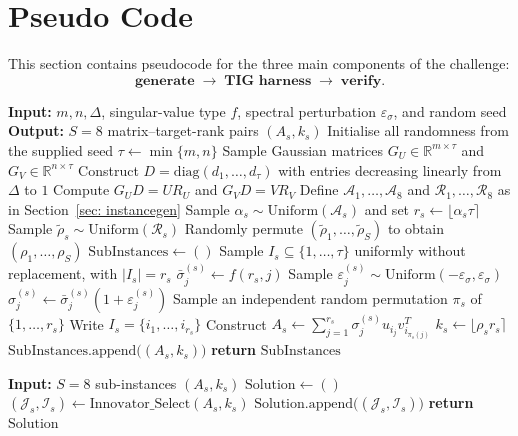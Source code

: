 \documentclass[12pt, legalpaper]{article}
\begin{document}
\section{Pseudo Code}
This section contains pseudocode for the three main components of the
challenge:
\[
\textbf{generate} \;\longrightarrow\; \textbf{TIG harness}
\;\longrightarrow\; \textbf{verify}.
\]

\begin{algorithm}
\caption{\textbf{Generate} the eight CUR sub-instances.}
\label{sec:algorithm_generate}
\begin{algorithmic}[1]
\STATE \textbf{Input:} $m,n,\Delta$, singular-value type $f$, spectral
perturbation $\varepsilon_\sigma$, and random seed
\STATE \textbf{Output:} $S=8$ matrix--target-rank pairs $(A_s,k_s)$
\STATE Initialise all randomness from the supplied seed
\STATE $\tau \gets \min\{m,n\}$
\STATE Sample Gaussian matrices $G_U\in\mathbb{R}^{m\times\tau}$ and
$G_V\in\mathbb{R}^{n\times\tau}$
\STATE Construct $D=\mathrm{diag}(d_1,\ldots,d_\tau)$ with entries decreasing
linearly from $\Delta$ to $1$
\STATE Compute $G_UD=UR_U$ and $G_VD=VR_V$
\STATE Define $\mathcal A_1,\ldots,\mathcal A_8$ and
$\mathcal R_1,\ldots,\mathcal R_8$ as in Section~\ref{sec: instancegen}
    \STATE Sample $\alpha_s\sim\mathrm{Uniform}(\mathcal A_s)$ and set
    $r_s\gets\lfloor\alpha_s\tau\rceil$
    \STATE Sample $\widetilde{\rho}_s\sim\mathrm{Uniform}(\mathcal R_s)$
\ENDFOR
\STATE Randomly permute $(\widetilde{\rho}_1,\ldots,\widetilde{\rho}_S)$ to
obtain $(\rho_1,\ldots,\rho_S)$
\STATE $\mathrm{SubInstances}\gets ()$
    \STATE Sample $I_s\subseteq\{1,\ldots,\tau\}$ uniformly without
    replacement, with $|I_s|=r_s$
        \STATE $\bar{\sigma}^{(s)}_j \gets f(r_s,j)$
        \STATE Sample $\varepsilon^{(s)}_j \sim
        \mathrm{Uniform}(-\varepsilon_\sigma,\varepsilon_\sigma)$
        \STATE $\sigma^{(s)}_j \gets \bar{\sigma}^{(s)}_j
        (1+\varepsilon^{(s)}_j)$
    \ENDFOR
    \STATE Sample an independent random permutation $\pi_s$ of
    $\{1,\ldots,r_s\}$
    \STATE Write $I_s=\{i_1,\ldots,i_{r_s}\}$
    \STATE Construct
    $A_s \gets \sum_{j=1}^{r_s}\sigma^{(s)}_j
    u_{i_j}v_{i_{\pi_s(j)}}^T$
    \STATE $k_s\gets\lfloor\rho_s r_s\rceil$
    \STATE $\mathrm{SubInstances.append}\big((A_s,k_s)\big)$
\ENDFOR
\STATE \textbf{return} $\mathrm{SubInstances}$
\end{algorithmic}
\end{algorithm}

\begin{algorithm}
\caption{\textbf{TIG harness} that runs innovator submissions.}
\label{sec:algorithm_harness}
\begin{algorithmic}[1]
\STATE \textbf{Input:} $S=8$ sub-instances $(A_s,k_s)$
\STATE $\mathrm{Solution}\gets ()$
    \STATE $(\mathcal J_s,\mathcal I_s)\gets
    \mathrm{Innovator\_Select}(A_s,k_s)$
    \STATE $\mathrm{Solution.append}\big((\mathcal J_s,\mathcal I_s)\big)$
\ENDFOR
\STATE \textbf{return} $\mathrm{Solution}$
\end{algorithmic}
\end{algorithm}
\end{document}
